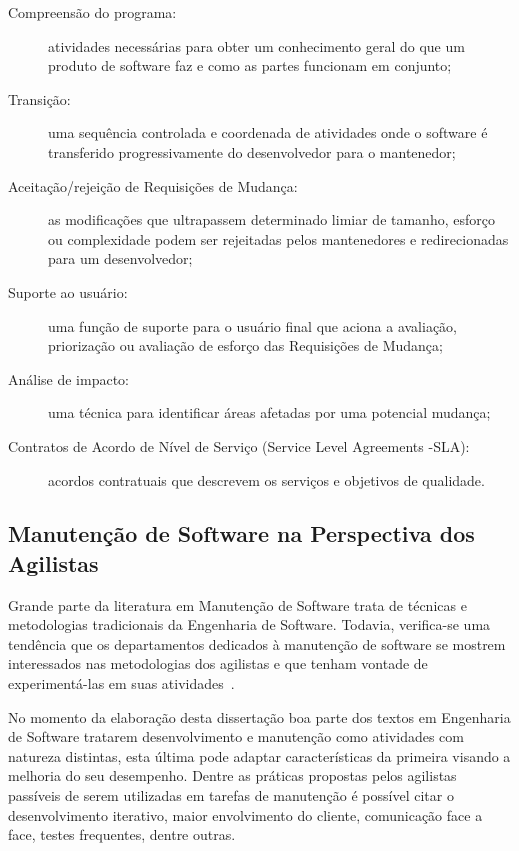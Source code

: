 \begin{description}
	\item[Compreensão do programa:] atividades necessárias para obter um
		conhecimento geral do que um produto de software faz e como as partes
		funcionam em conjunto;
	\item[Transição:] uma sequência controlada e coordenada de atividades onde o
		software é transferido progressivamente do desenvolvedor para o
		mantenedor;
	\item[Aceitação/rejeição de Requisições de Mudança:] as modificações
		que ultrapassem determinado limiar de tamanho, esforço ou complexidade
		podem ser rejeitadas pelos mantenedores e redirecionadas para um
		desenvolvedor;
	\item[Suporte ao usuário:] uma função de suporte para o usuário final que
		aciona a avaliação, priorização ou avaliação de esforço das Requisições
		de Mudança;
	\item[Análise de impacto:] uma técnica para identificar áreas afetadas por
		uma potencial mudança;
	\item[Contratos de Acordo de Nível de Serviço (Service Level Agreements
		\@-\@ SLA):] acordos contratuais que descrevem os serviços e objetivos
		de qualidade.
\end{description}
\todoend

\subsection{Manutenção de Software na Perspectiva dos Agilistas}
\label{sub:manutenção_de_software_com_método_dos_agilistas}

Grande parte da literatura em Manutenção de Software trata de técnicas e
metodologias tradicionais da Engenharia de Software. Todavia, verifica-se uma
tendência que os departamentos dedicados à manutenção de software se mostrem
interessados nas metodologias dos agilistas e que tenham vontade de
experimentá-las em suas atividades~\cite{Heeager2015}.

No momento da elaboração desta dissertação boa parte dos textos em Engenharia de
Software tratarem desenvolvimento e manutenção como atividades com natureza
distintas, esta última pode adaptar características da primeira visando a
melhoria do seu desempenho. Dentre as práticas propostas pelos agilistas
passíveis de serem utilizadas em tarefas de manutenção é possível citar o
desenvolvimento iterativo, maior envolvimento do cliente, comunicação face a
face, testes frequentes, dentre outras.

